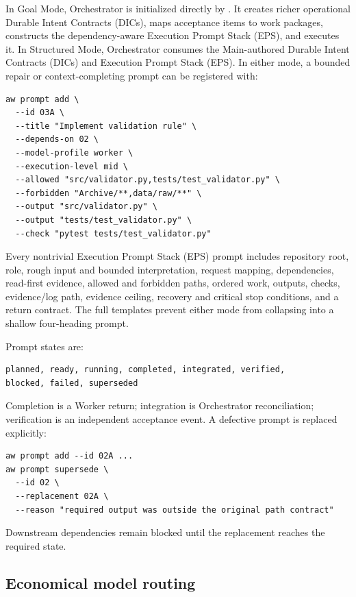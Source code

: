 \documentclass[11pt,a4paper]{article}
\newcommand{\code}[1]{\texttt{\detokenize{#1}}}
\begin{document}
In Goal Mode, Orchestrator is initialized directly by \code{GOAL.md}. It creates richer operational
Durable Intent Contracts (DICs), maps acceptance items to work packages, constructs the dependency-aware Execution Prompt Stack (EPS), and executes it.
In Structured Mode, Orchestrator consumes the Main-authored Durable Intent Contracts (DICs) and Execution Prompt Stack (EPS). In either mode, a bounded
repair or context-completing prompt can be registered with:

\begin{lstlisting}[style=workflow]
aw prompt add \
  --id 03A \
  --title "Implement validation rule" \
  --depends-on 02 \
  --model-profile worker \
  --execution-level mid \
  --allowed "src/validator.py,tests/test_validator.py" \
  --forbidden "Archive/**,data/raw/**" \
  --output "src/validator.py" \
  --output "tests/test_validator.py" \
  --check "pytest tests/test_validator.py"
\end{lstlisting}

Every nontrivial Execution Prompt Stack (EPS) prompt includes repository root, role, rough input and bounded interpretation,
request mapping, dependencies, read-first evidence, allowed and forbidden paths, ordered work,
outputs, checks, evidence/log path, evidence ceiling, recovery and critical stop conditions, and a
return contract. The full templates prevent either mode from collapsing into a shallow
four-heading prompt.

Prompt states are:

\begin{lstlisting}[style=workflow]
planned, ready, running, completed, integrated, verified,
blocked, failed, superseded
\end{lstlisting}

Completion is a Worker return; integration is Orchestrator reconciliation; verification is an
independent acceptance event. A defective prompt is replaced explicitly:

\begin{lstlisting}[style=workflow]
aw prompt add --id 02A ...
aw prompt supersede \
  --id 02 \
  --replacement 02A \
  --reason "required output was outside the original path contract"
\end{lstlisting}

Downstream dependencies remain blocked until the replacement reaches the required state.

\subsection{Economical model routing}
\end{document}
